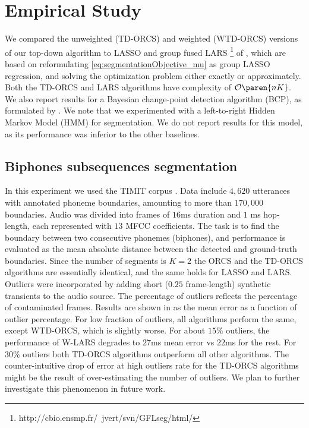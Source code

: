 \section{Empirical Study}\label{sec:experimentalResults}
We compared the unweighted (\mbox{TD-ORCS}) and weighted
(\mbox{WTD-ORCS}) versions of our top-down algorithm to LASSO and group fused \mbox{LARS} \footnote{http://cbio.ensmp.fr/~jvert/svn/GFLseg/html/} of \cite{bleakley2011group},
which are based on reformulating \eqref{eq:segmentationObjective_mu} as group
LASSO regression, and solving the optimization problem either exactly or approximately.
Both the \mbox{TD-ORCS} and \mbox{LARS} algorithms
have complexity of $\mathcal{O}\paren{nK}$.
We also report results for a Bayesian change-point detection algorithm \mbox{(BCP)}, as formulated by \cite{erdman2008fast}. We note that we experimented with a left-to-right Hidden Markov Model (HMM) for segmentation. We do not report results for this model, as its performance was inferior to the other baselines.

%

\subsection{Biphones subsequences segmentation}\label{sec:biphonesSegExperiment}
In this experiment we used the \mbox{TIMIT} corpus %
\cite{garofolo1988timit}. Data include $4,620$ utterances with annotated phoneme boundaries, amounting to
more than $170,000$ boundaries. Audio was divided into frames
of $16$ms duration and
$1$ ms hop-length, each represented with $13$
\mbox{MFCC} coefficients. The task is to find the boundary between two
consecutive phonemes (biphones), and performance is evaluated as the mean
absolute distance between the detected and
ground-truth boundaries.
Since the number of segments is $K=2$ the \mbox{ORCS} and the
\mbox{TD-ORCS} algorithms are essentially identical, and the same holds for \mbox{LASSO} and \mbox{LARS}.
Outliers were incorporated by adding short ($0.25$ frame-length) synthetic transients to the audio source.
The percentage
of outliers reflects the percentage of contaminated frames. Results are shown in  as the mean error as a function of outlier percentage.
For low fraction of outliers, all algorithms perform the same, except
\mbox{WTD-ORCS}, which is slightly worse. For about $15\%$ outliers, the
performance of \mbox{W-LARS} degrades to \textapprox$27$ms mean error vs
\textapprox$22$ms for the rest. For $30\%$ outliers
both \mbox{TD-ORCS} algorithms outperform all other algorithms.
The counter-intuitive drop of error at high outliers rate for the \mbox{TD-ORCS} algorithms
might be the result of over-estimating the number of outliers. We plan to further investigate this phenomenon in future work.

